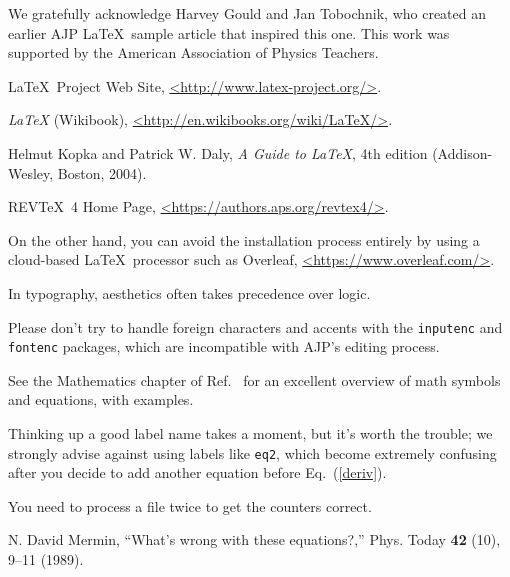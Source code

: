 \documentclass[prb,preprint]{revtex4-2}
\begin{document}
\begin{acknowledgments}

We gratefully acknowledge Harvey Gould and Jan Tobochnik, who created an earlier 
AJP \LaTeX\ sample article that inspired this one.  This work was supported by the 
American Association of Physics Teachers.

\end{acknowledgments}


\begin{thebibliography}{99}

 \LaTeX\ Project Web Site, \url{<http://www.latex-project.org/>}.

 \textit{\LaTeX} (Wikibook), \url{<http://en.wikibooks.org/wiki/LaTeX/>}.

Helmut Kopka and Patrick W. Daly, \textit{A Guide to
\LaTeX}, 4th edition (Addison-Wesley, Boston, 2004).

 REV\TeX\ 4 Home Page, \url{<https://authors.aps.org/revtex4/>}.

 On the other hand, you can avoid the installation process
entirely by using a cloud-based \LaTeX\ processor such as Overleaf,
\url{<https://www.overleaf.com/>}.

 In typography, aesthetics often takes precedence over logic.

 Please don't try to handle foreign characters 
and accents with the \texttt{inputenc} and \texttt{fontenc} packages, which 
are incompatible with AJP's editing process.

 See the Mathematics chapter of Ref.~
for an excellent overview of math symbols and equations, with examples.

 Thinking up a good label name takes a moment, but 
it's worth the trouble; we strongly advise against using labels like 
\texttt{eq2}, which become extremely confusing after you decide to add 
another equation before Eq.~(\ref{deriv}).

 You need to process a file twice to get the counters correct.

N. David Mermin, 
``What's wrong with these equations?,'' 
Phys. Today 
\textbf{42} (10), 
9--11 (1989).  


\end{thebibliography}
\end{document}
